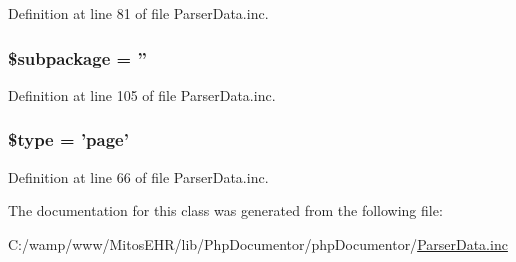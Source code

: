 \-Definition at line 81 of file \-Parser\-Data.\-inc.

\hypertarget{classparser_page_ac601dc8dc2a086b6381128cc9c7a3fc5}{
\subsubsection[{\$subpackage}]{\setlength{\rightskip}{0pt plus 5cm}\$subpackage = ''}}\label{classparser_page_ac601dc8dc2a086b6381128cc9c7a3fc5}


\-Definition at line 105 of file \-Parser\-Data.\-inc.

\hypertarget{classparser_page_a9a4a6fba2208984cabb3afacadf33919}{
\subsubsection[{\$type}]{\setlength{\rightskip}{0pt plus 5cm}\$type = 'page'}}\label{classparser_page_a9a4a6fba2208984cabb3afacadf33919}


\-Definition at line 66 of file \-Parser\-Data.\-inc.



\-The documentation for this class was generated from the following file\-:\begin{DoxyCompactItemize}
\item 
\-C\-:/wamp/www/\-Mitos\-E\-H\-R/lib/\-Php\-Documentor/php\-Documentor/\hyperlink{_parser_data_8inc}{\-Parser\-Data.\-inc}\end{DoxyCompactItemize}
